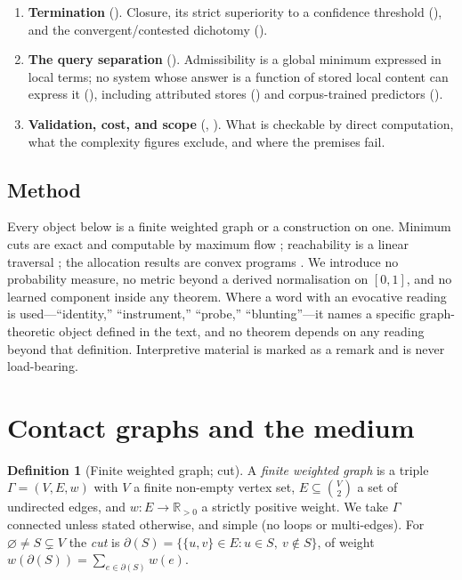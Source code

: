 \documentclass[11pt,twocolumn,a4paper]{article}
\theoremstyle{dirthm}
\theoremstyle{definition}
\newtheorem{definition}[theorem]{Definition}
\theoremstyle{remark}
\newcommand{\R}{\mathbb{R}}
\newcommand{\Gph}{\Gamma}
\newcommand{\V}{V}
\newcommand{\E}{E}
\newcommand{\wt}{w}
\newcommand{\cut}{\partial}
\newcommand{\set}[1]{\{#1\}}
\begin{document}
\begin{enumerate}[leftmargin=1.5em,itemsep=2.5pt]
\item \textbf{Termination} (). Closure, its strict
superiority to a confidence threshold (), and the
convergent/contested dichotomy ().

\item \textbf{The query separation} (). Admissibility is
a global minimum expressed in local terms; no system whose answer is a
function of stored local content can express it
(), including attributed stores
() and corpus-trained predictors
().

\item \textbf{Validation, cost, and scope} (,
). What is checkable by direct computation, what the
complexity figures exclude, and where the premises fail.
\end{enumerate}

\subsection{Method}

Every object below is a finite weighted graph or a construction on one.
Minimum cuts are exact and computable by maximum flow
\citep{fordfulkerson1956,menger1927,edmondskarp1972,stoer1997}; reachability
is a linear traversal \citep{tarjan1972}; the allocation results are convex
programs \citep{boyd2004,kuhntucker1951}. We introduce no probability
measure, no metric beyond a derived normalisation on $[0,1]$, and no learned
component inside any theorem. Where a word with an evocative reading is
used---``identity,'' ``instrument,'' ``probe,'' ``blunting''---it names a
specific graph-theoretic object defined in the text, and no theorem depends
on any reading beyond that definition. Interpretive material is marked as a
remark and is never load-bearing.

\section{Contact graphs and the medium}
\label{sec:graph}

\begin{definition}[Finite weighted graph; cut]
\label{def:graph}
A \emph{finite weighted graph} is a triple $\Gph=(\V,\E,\wt)$ with $\V$ a
finite non-empty vertex set, $\E\subseteq\binom{\V}{2}$ a set of undirected
edges, and $\wt\colon\E\to\R_{>0}$ a strictly positive weight. We take
$\Gph$ connected unless stated otherwise, and simple (no loops or
multi-edges). For $\varnothing\neq S\subsetneq\V$ the \emph{cut} is
$\cut(S)=\set{\set{u,v}\in\E : u\in S,\ v\notin S}$, of weight
$\wt(\cut(S))=\sum_{e\in\cut(S)}\wt(e)$.
\end{definition}
\end{document}
